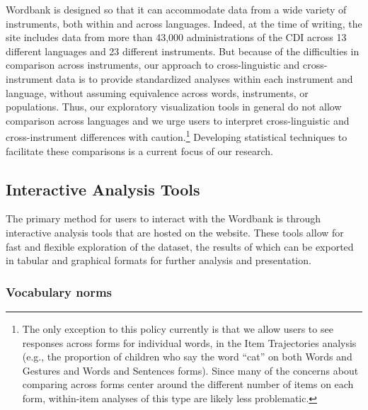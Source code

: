 \documentclass[man,noapacite]{apa}
\begin{document}
Wordbank is designed so that it can accommodate data from a wide variety of instruments, both within and across languages. Indeed, at the time of writing, the site includes data from more than 43,000 administrations of the CDI across 13 different languages and 23 different instruments. But because of the difficulties in comparison across instruments, our approach to cross-linguistic and cross-instrument data is to provide standardized analyses within each instrument and language, without assuming equivalence across words, instruments, or populations. Thus, our exploratory visualization tools in general do not allow comparison across languages and we urge users to interpret cross-linguistic and cross-instrument differences with caution.\footnote{The only exception to this policy currently is that we allow users to see responses across forms for individual words, in the Item Trajectories analysis (e.g., the proportion of children who say the word ``cat'' on both Words and Gestures and Words and Sentences forms). Since many of the concerns about comparing across forms center around the different number of items on each form, within-item analyses of this type are likely less problematic.} Developing statistical techniques to facilitate these comparisons is a current focus of our research. 

\subsection{Interactive Analysis Tools}

The primary method for users to interact with the Wordbank is through interactive analysis tools that are hosted on the website. These tools allow for fast and flexible exploration of the dataset, the results of which can be exported in tabular and graphical formats for further analysis and presentation. 

\subsubsection{Vocabulary norms}
\end{document}
